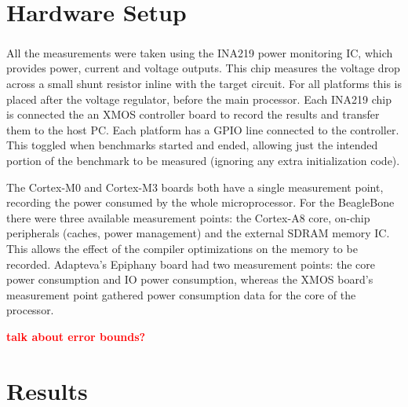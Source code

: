 \documentclass[twocolumn]{article}
\newcommand{\todo}[1]{\textbf{\textcolor{red}{#1}}}
\let\oldcite\cite
\renewcommand{\cite}[1]{\textsuperscript{\oldcite{#1}}}
\begin{document}


\section*{Hardware Setup}

All the measurements were taken using the INA219 power monitoring IC\cite{INA219}, which provides power, current and voltage outputs. This chip measures the voltage drop across a small shunt resistor inline with the target circuit. For all platforms this is placed after the voltage regulator, before the main processor. Each INA219 chip is connected the an XMOS controller board to record the results and transfer them to the host PC. Each platform has a GPIO line connected to the controller. This toggled when benchmarks started and ended, allowing just the intended portion of the benchmark to be measured (ignoring any extra initialization code).

The Cortex-M0 and Cortex-M3 boards both have a single measurement point, recording the power consumed by the whole microprocessor. For the BeagleBone there were three available measurement points: the Cortex-A8 core, on-chip peripherals (caches, power management) and the external SDRAM memory IC. This allows the effect of the compiler optimizations on the memory to be recorded. Adapteva's Epiphany board had two measurement points: the core power consumption and IO power consumption, whereas the XMOS board's measurement point gathered power consumption data for the core of the processor.

\todo{talk about error bounds?}


\section*{Results}
\end{document}
